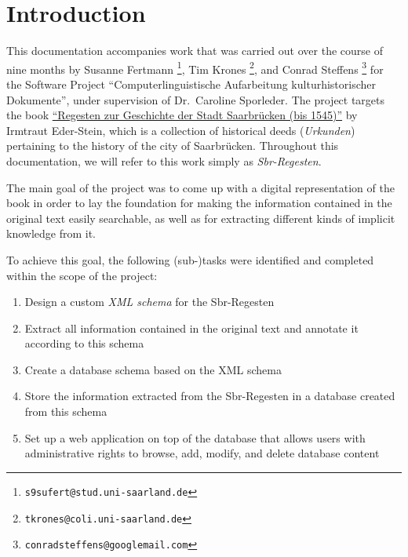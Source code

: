\section{Introduction}
\label{sec:intro}

This documentation accompanies work that was carried out over the
course of nine months by Susanne Fertmann
\footnote{\texttt{s9sufert@stud.uni-saarland.de}}, Tim Krones
\footnote{\texttt{tkrones@coli.uni-saarland.de}}, and Conrad Steffens
\footnote{\texttt{conradsteffens@googlemail.com}} for the Software
Project ``Computerlinguistische Aufarbeitung kulturhistorischer
Dokumente'', under supervision of Dr.~Caroline Sporleder. The project
targets the book \href{http://universaar.uni-saarland.de/monographien/volltexte/2012/82/pdf/regesten.pdf}{``Regesten zur Geschichte der Stadt Saarbrücken (bis
1545)''} by Irmtraut Eder-Stein, which is a collection of historical
deeds (\emph{Urkunden}) pertaining to the history of the city of
Saarbrücken. Throughout this documentation, we will refer to this work
simply as \emph{Sbr-Regesten}.

The main goal of the project was to come up with a digital
representation of the book in order to lay the foundation for making
the information contained in the original text easily searchable, as
well as for extracting different kinds of implicit knowledge from it.

To achieve this goal, the following (sub-)tasks were identified and
completed within the scope of the project:

\begin{enumerate}
\item Design a custom \emph{XML schema} for the Sbr-Regesten
\item Extract all information contained in the original text and
  annotate it according to this schema
\item Create a database schema based on the XML schema
\item Store the information extracted from the Sbr-Regesten in a
  database created from this schema
\item Set up a web application on top of the database that allows
  users with administrative rights to browse, add, modify, and delete
  database content
\end{enumerate}

